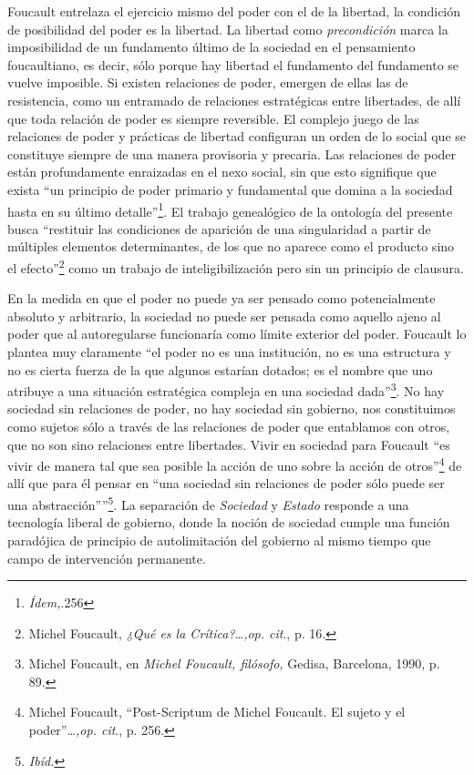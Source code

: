 Foucault entrelaza el ejercicio mismo del poder con el de la libertad, la condición de posibilidad del poder es la libertad. La libertad como \emph{precondición} marca la imposibilidad de un fundamento último de la sociedad en el pensamiento foucaultiano, es decir, sólo porque hay libertad el fundamento del fundamento se vuelve imposible. Si existen relaciones de poder, emergen de ellas las de resistencia, como un entramado de relaciones estratégicas entre libertades, de allí que toda relación de poder es siempre reversible. El complejo juego de las relaciones de poder y prácticas de libertad configuran un orden de lo social que se constituye siempre de una manera provisoria y precaria. Las relaciones de poder están profundamente enraizadas en el nexo social, sin que esto signifique que exista \enquote{un principio de poder primario y fundamental que domina a la sociedad hasta en su último detalle}\footnote{\emph{Ídem,}.256}. El trabajo genealógico de la ontología del presente busca \enquote{restituir las condiciones de aparición de una singularidad a partir de múltiples elementos determinantes, de los que no aparece como el producto sino el efecto}\footnote{Michel Foucault, \emph{¿Qué es la Crítica?\ldots,op. cit}., p. 16.} como un trabajo de inteligibilización pero sin un principio de clausura.

En la medida en que el poder no puede ya ser pensado como potencialmente absoluto y arbitrario, la sociedad no puede ser pensada como aquello ajeno al poder que al autoregularse funcionaría como límite exterior del poder. Foucault lo plantea muy claramente \enquote{el poder no es una institución, no es una estructura y no es cierta fuerza de la que algunos estarían dotados; es el nombre que uno atribuye a una situación estratégica compleja en una sociedad dada}\footnote{Michel Foucault, en \emph{Michel Foucault, filósofo,} Gedisa, Barcelona, 1990, p. 89.}. No hay sociedad sin relaciones de poder, no hay sociedad sin gobierno, nos constituimos como sujetos sólo a través de las relaciones de poder que entablamos con otros, que no son sino relaciones entre libertades. Vivir en sociedad para Foucault \enquote{es vivir de manera tal que sea posible la acción de uno sobre la acción de otros}\footnote{Michel Foucault, \enquote{Post-Scriptum de Michel Foucault. El sujeto y el poder}\emph{\ldots,op. cit}., p. 256.} de allí que para él pensar en \enquote{una sociedad sin relaciones de poder sólo puede ser una abstracción''}\footnote{\emph{Ibíd.}}. La separación de \emph{Sociedad} y \emph{Estado} responde a una tecnología liberal de gobierno, donde la noción de sociedad cumple una función paradójica de principio de autolimitación del gobierno al mismo tiempo que campo de intervención permanente.

